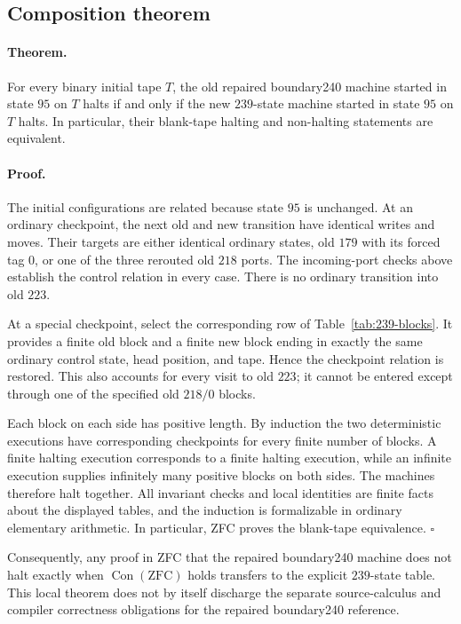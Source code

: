 \subsection{Composition theorem}

\paragraph{Theorem.}
For every binary initial tape $T$, the old repaired boundary240
machine started in state $95$ on $T$ halts if and only if the
new $239$-state machine started in state $95$ on $T$ halts.
In particular, their blank-tape halting and non-halting statements
are equivalent.

\paragraph{Proof.}
The initial configurations are related because state $95$ is unchanged.
At an ordinary checkpoint, the next old and new transition have identical
writes and moves.  Their targets are either identical ordinary states,
old $179$ with its forced tag $0$, or one of the three rerouted old
$218$ ports.  The incoming-port checks above establish the control
relation in every case.  There is no ordinary transition into old $223$.

At a special checkpoint, select the corresponding row of
Table~\ref{tab:239-blocks}.  It provides a finite old block and a
finite new block ending in exactly the same ordinary control state,
head position, and tape.  Hence the checkpoint relation is restored.
This also accounts for every visit to old $223$; it cannot be entered
except through one of the specified old $218/0$ blocks.

Each block on each side has positive length.  By induction the two
deterministic executions have corresponding checkpoints for every
finite number of blocks.  A finite halting execution corresponds
to a finite halting execution, while an infinite execution supplies
infinitely many positive blocks on both sides.  The machines therefore
halt together.  All invariant checks and local identities are finite
facts about the displayed tables, and the induction is formalizable
in ordinary elementary arithmetic.  In particular, ZFC proves the
blank-tape equivalence. \hfill$\square$

Consequently, any proof in ZFC that the repaired boundary240 machine
does not halt exactly when $\operatorname{Con}(\mathrm{ZFC})$ holds
transfers to the explicit $239$-state table.  This local theorem does
not by itself discharge the separate source-calculus and compiler
correctness obligations for the repaired boundary240 reference.

